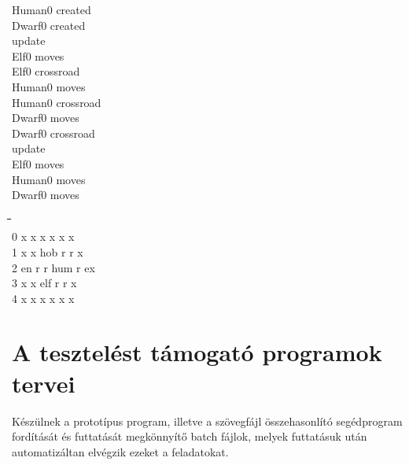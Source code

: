 \begin{itemize}
{Human0 created \\
Dwarf0 created \\
update \\
Elf0 moves \\
Elf0 crossroad \\
Human0 moves \\
Human0 crossroad \\
Dwarf0 moves \\
Dwarf0 crossroad \\
update \\
Elf0 moves \\
Human0 moves \\
Dwarf0 moves \\
\begin{tabbing}
\hspace*{1cm}\=\hspace*{1cm}\=\hspace*{1cm}\=\hspace*{1cm}\=\hspace*{1cm}\=\hspace*{1cm}\=\hspace*{1cm}\= \kill
       \\
0 \> x \> x \> x \> x \> x \> x \\
1 \> x \> x \> hob \> r \> r \> x \\
2 \> en \> r \> r \> hum \> r \> ex \\
3 \> x \> x \> elf \> r \> r \> x \\
4 \> x \> x \> x \> x \> x \> x
\end{tabbing}
}
\end{itemize}

\section{A tesztelést támogató programok tervei}

Készülnek a prototípus program, illetve a szövegfájl összehasonlító segédprogram fordítását és futtatását megkönnyítő batch fájlok, melyek futtatásuk után automatizáltan elvégzik ezeket a feladatokat.


